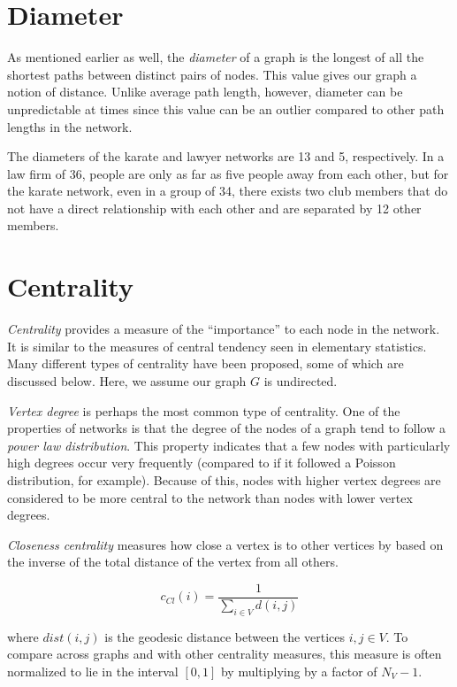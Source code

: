 \documentclass[12pt,twoside]{amherstthesis}
\begin{document}
  \section{Diameter}\label{diameter}
  
  As mentioned earlier as well, the \emph{diameter} of a graph is the
  longest of all the shortest paths between distinct pairs of nodes. This
  value gives our graph a notion of distance. Unlike average path length,
  however, diameter can be unpredictable at times since this value can be
  an outlier compared to other path lengths in the network.
  
  The diameters of the karate and lawyer networks are 13 and 5,
  respectively. In a law firm of 36, people are only as far as five people
  away from each other, but for the karate network, even in a group of 34,
  there exists two club members that do not have a direct relationship
  with each other and are separated by 12 other members.
  
  \section{Centrality}\label{centrality}
  
  \emph{Centrality} provides a measure of the ``importance'' to each node
  in the network. It is similar to the measures of central tendency seen
  in elementary statistics. Many different types of centrality have been
  proposed, some of which are discussed below. Here, we assume our graph
  \(G\) is undirected.
  
  \emph{Vertex degree} is perhaps the most common type of centrality. One
  of the properties of networks is that the degree of the nodes of a graph
  tend to follow a \emph{power law distribution}. This property indicates
  that a few nodes with particularly high degrees occur very frequently
  (compared to if it followed a Poisson distribution, for example).
  Because of this, nodes with higher vertex degrees are considered to be
  more central to the network than nodes with lower vertex degrees.
  
  \emph{Closeness centrality} measures how close a vertex is to other
  vertices by based on the inverse of the total distance of the vertex
  from all others.
  
  \[c_{Cl}(i) = \frac {1} {\sum_{i \in V}^{} d(i, j)}\]
  
  where \(dist(i,j)\) is the geodesic distance between the vertices
  \(i,j \in V\). To compare across graphs and with other centrality
  measures, this measure is often normalized to lie in the interval
  \([0,1]\) by multiplying by a factor of \(N_V - 1\).
  
\end{document}
